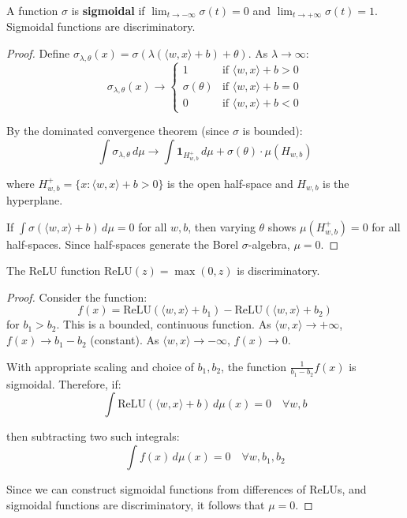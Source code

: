 \documentclass[main.tex]{subfiles}
\begin{document}
\begin{lemma}
A function $\sigma$ is \textbf{sigmoidal} if $\lim_{t \to -\infty} \sigma(t) = 0$ and $\lim_{t \to +\infty} \sigma(t) = 1$. Sigmoidal functions are discriminatory.
\end{lemma}

\begin{proof}
Define $\sigma_{\lambda,\theta}(x) = \sigma(\lambda(\langle w, x \rangle + b) + \theta)$. As $\lambda \to \infty$:
$$\sigma_{\lambda,\theta}(x) \to \begin{cases} 1 & \text{if } \langle w, x \rangle + b > 0 \\ \sigma(\theta) & \text{if } \langle w, x \rangle + b = 0 \\ 0 & \text{if } \langle w, x \rangle + b < 0 \end{cases}$$

By the dominated convergence theorem (since $\sigma$ is bounded):
$$\int \sigma_{\lambda,\theta} \, d\mu \to \int \mathbf{1}_{H^+_{w,b}} \, d\mu + \sigma(\theta) \cdot \mu(H_{w,b})$$

where $H^+_{w,b} = \{x : \langle w, x \rangle + b > 0\}$ is the open half-space and $H_{w,b}$ is the hyperplane.

If $\int \sigma(\langle w, x \rangle + b) \, d\mu = 0$ for all $w, b$, then varying $\theta$ shows $\mu(H^+_{w,b}) = 0$ for all half-spaces. Since half-spaces generate the Borel $\sigma$-algebra, $\mu = 0$.
\end{proof}

\begin{lemma}
The ReLU function $\text{ReLU}(z) = \max(0, z)$ is discriminatory.
\end{lemma}

\begin{proof}
Consider the function:
$$f(x) = \text{ReLU}(\langle w, x \rangle + b_1) - \text{ReLU}(\langle w, x \rangle + b_2)$$
for $b_1 > b_2$. This is a bounded, continuous function. As $\langle w, x \rangle \to +\infty$, $f(x) \to b_1 - b_2$ (constant). As $\langle w, x \rangle \to -\infty$, $f(x) \to 0$.

With appropriate scaling and choice of $b_1, b_2$, the function $\frac{1}{b_1 - b_2}f(x)$ is sigmoidal. Therefore, if:
$$\int \text{ReLU}(\langle w, x \rangle + b) \, d\mu(x) = 0 \quad \forall w, b$$

then subtracting two such integrals:
$$\int f(x) \, d\mu(x) = 0 \quad \forall w, b_1, b_2$$

Since we can construct sigmoidal functions from differences of ReLUs, and sigmoidal functions are discriminatory, it follows that $\mu = 0$.
\end{proof}
\end{document}
